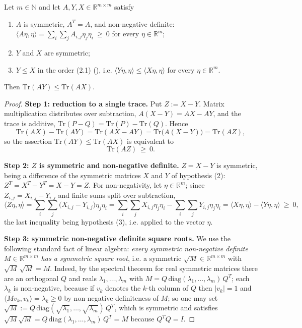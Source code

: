 \begin{theorem}
Let $m\in\mathbb N$ and let $A,Y,X\in\mathbb R^{m\times m}$ satisfy
\begin{enumerate}
\item $A$ is symmetric, $A^{T}=A$, and non-negative definite:
  $\langle A\eta,\eta\rangle=\sum_{i}\sum_{j}A_{i,j}\eta_j\eta_i\ \ge\ 0$ for every
  $\eta\in\mathbb R^{m}$;
\item $Y$ and $X$ are symmetric;
\item $Y\le X$ in the order (2.1) (), i.e.
  $\langle Y\eta,\eta\rangle\le\langle X\eta,\eta\rangle$ for every $\eta\in\mathbb R^{m}$.
\end{enumerate}
Then $\mathrm{Tr}(AY)\le\mathrm{Tr}(AX)$.
\end{theorem}
\begin{proof}
\noindent\textbf{Step 1: reduction to a single trace.} Put $Z:=X-Y$. Matrix multiplication
distributes over subtraction, $A(X-Y)=AX-AY$, and the trace is additive,
$\mathrm{Tr}(P-Q)=\mathrm{Tr}(P)-\mathrm{Tr}(Q)$. Hence
\[
 \mathrm{Tr}(AX)-\mathrm{Tr}(AY)=\mathrm{Tr}(AX-AY)=\mathrm{Tr}\big(A(X-Y)\big)=\mathrm{Tr}(AZ),
\]
so the assertion $\mathrm{Tr}(AY)\le\mathrm{Tr}(AX)$ is equivalent to
\[
 \mathrm{Tr}(AZ)\ \ge\ 0. \tag{1}
\]

\medskip\noindent\textbf{Step 2: $Z$ is symmetric and non-negative definite.} $Z=X-Y$ is
symmetric, being a difference of the symmetric matrices $X$ and $Y$ of hypothesis (2):
$Z^{T}=X^{T}-Y^{T}=X-Y=Z$. For non-negativity, let $\eta\in\mathbb R^{m}$; since
$Z_{i,j}=X_{i,j}-Y_{i,j}$ and finite sums split over subtraction,
\[
 \langle Z\eta,\eta\rangle=\sum_{i}\sum_{j}\big(X_{i,j}-Y_{i,j}\big)\eta_j\eta_i
  =\sum_{i}\sum_{j}X_{i,j}\eta_j\eta_i-\sum_{i}\sum_{j}Y_{i,j}\eta_j\eta_i
  =\langle X\eta,\eta\rangle-\langle Y\eta,\eta\rangle\ \ge\ 0,
\]
the last inequality being hypothesis (3), i.e.  applied to the vector $\eta$.

\medskip\noindent\textbf{Step 3: symmetric non-negative definite square roots.} We use the
following standard fact of linear algebra: \emph{every symmetric non-negative definite
$M\in\mathbb R^{m\times m}$ has a symmetric square root}, i.e. a symmetric
$\sqrt M\in\mathbb R^{m\times m}$ with $\sqrt M\,\sqrt M=M$. Indeed, by the spectral theorem
for real symmetric matrices there are an orthogonal $Q$ and reals
$\lambda_1,\ldots,\lambda_m$ with $M=Q\,\mathrm{diag}(\lambda_1,\ldots,\lambda_m)\,Q^{T}$;
each $\lambda_k$ is non-negative, because if $v_k$ denotes the $k$-th column of $Q$ then
$|v_k|=1$ and $\langle Mv_k,v_k\rangle=\lambda_k\ge0$ by non-negative definiteness of $M$;
so one may set $\sqrt M:=Q\,\mathrm{diag}(\sqrt{\lambda_1},\ldots,\sqrt{\lambda_m})\,Q^{T}$,
which is symmetric and satisfies
$\sqrt M\sqrt M=Q\,\mathrm{diag}(\lambda_1,\ldots,\lambda_m)\,Q^{T}=M$ because
$Q^{T}Q=I$.


\end{proof}
